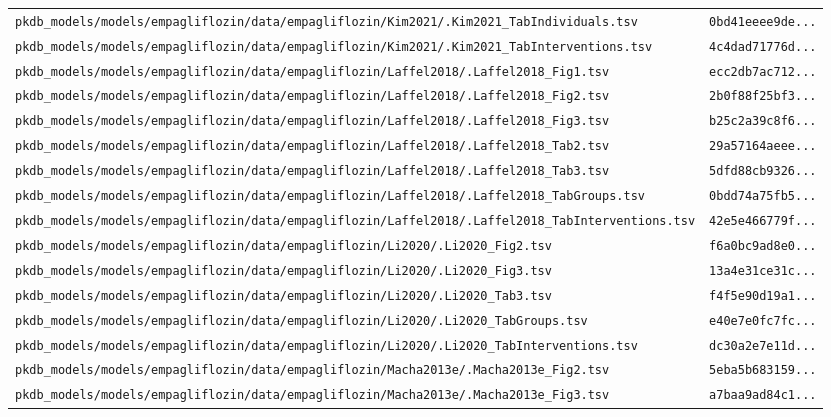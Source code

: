 \documentclass{article}
\begin{document}
\begin{longtable}{ll}
\texttt{pkdb\_models/models/empagliflozin/data/empagliflozin/Kim2021/.Kim2021\_TabIndividuals.tsv} & \texttt{0bd41eeee9de...} \\
\texttt{pkdb\_models/models/empagliflozin/data/empagliflozin/Kim2021/.Kim2021\_TabInterventions.tsv} & \texttt{4c4dad71776d...} \\
\texttt{pkdb\_models/models/empagliflozin/data/empagliflozin/Laffel2018/.Laffel2018\_Fig1.tsv} & \texttt{ecc2db7ac712...} \\
\texttt{pkdb\_models/models/empagliflozin/data/empagliflozin/Laffel2018/.Laffel2018\_Fig2.tsv} & \texttt{2b0f88f25bf3...} \\
\texttt{pkdb\_models/models/empagliflozin/data/empagliflozin/Laffel2018/.Laffel2018\_Fig3.tsv} & \texttt{b25c2a39c8f6...} \\
\texttt{pkdb\_models/models/empagliflozin/data/empagliflozin/Laffel2018/.Laffel2018\_Tab2.tsv} & \texttt{29a57164aeee...} \\
\texttt{pkdb\_models/models/empagliflozin/data/empagliflozin/Laffel2018/.Laffel2018\_Tab3.tsv} & \texttt{5dfd88cb9326...} \\
\texttt{pkdb\_models/models/empagliflozin/data/empagliflozin/Laffel2018/.Laffel2018\_TabGroups.tsv} & \texttt{0bdd74a75fb5...} \\
\texttt{pkdb\_models/models/empagliflozin/data/empagliflozin/Laffel2018/.Laffel2018\_TabInterventions.tsv} & \texttt{42e5e466779f...} \\
\texttt{pkdb\_models/models/empagliflozin/data/empagliflozin/Li2020/.Li2020\_Fig2.tsv} & \texttt{f6a0bc9ad8e0...} \\
\texttt{pkdb\_models/models/empagliflozin/data/empagliflozin/Li2020/.Li2020\_Fig3.tsv} & \texttt{13a4e31ce31c...} \\
\texttt{pkdb\_models/models/empagliflozin/data/empagliflozin/Li2020/.Li2020\_Tab3.tsv} & \texttt{f4f5e90d19a1...} \\
\texttt{pkdb\_models/models/empagliflozin/data/empagliflozin/Li2020/.Li2020\_TabGroups.tsv} & \texttt{e40e7e0fc7fc...} \\
\texttt{pkdb\_models/models/empagliflozin/data/empagliflozin/Li2020/.Li2020\_TabInterventions.tsv} & \texttt{dc30a2e7e11d...} \\
\texttt{pkdb\_models/models/empagliflozin/data/empagliflozin/Macha2013e/.Macha2013e\_Fig2.tsv} & \texttt{5eba5b683159...} \\
\texttt{pkdb\_models/models/empagliflozin/data/empagliflozin/Macha2013e/.Macha2013e\_Fig3.tsv} & \texttt{a7baa9ad84c1...} \\

\end{longtable}
\end{document}
